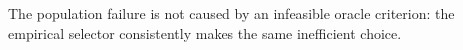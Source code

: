 The population failure is not caused by an infeasible oracle criterion: the empirical selector consistently makes the same inefficient choice.
